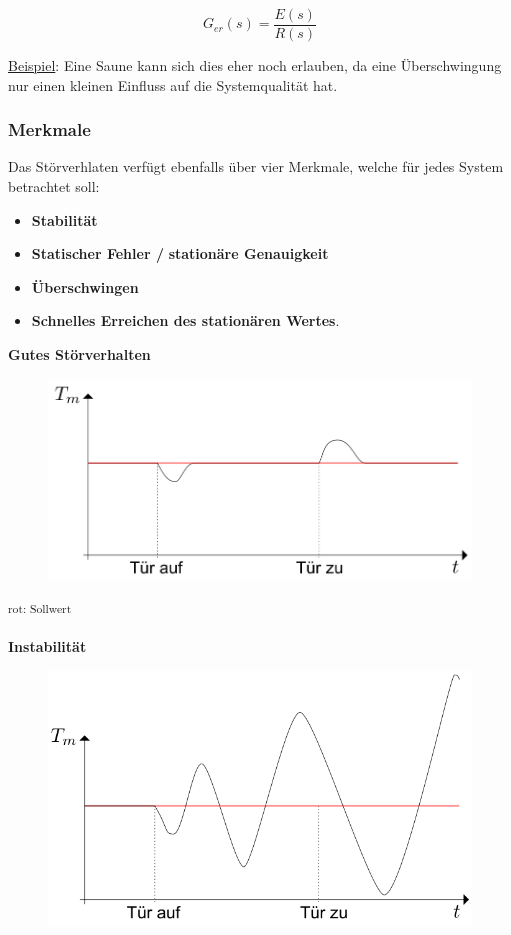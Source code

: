 \documentclass[
  10pt,
  a4paper,
]{article}
\providecommand{\tightlist}{%
  \setlength{\itemsep}{0pt}\setlength{\parskip}{0pt}}\usepackage{longtable,booktabs,array}
\numberwithin{equation}{section}
\begin{document}
\begin{multicols}{2}
\[
G_{er}(s)=\frac{E(s)}{R(s)}
\]

\ul{Beispiel}: Eine Saune kann sich dies eher noch erlauben, da eine
Überschwingung nur einen kleinen Einfluss auf die Systemqualität hat.

\hypertarget{merkmale-1}{%
\subsubsection{Merkmale}\label{merkmale-1}}

Das Störverhlaten verfügt ebenfalls über vier Merkmale, welche für jedes
System betrachtet soll:

\begin{itemize}
\tightlist
\item
  \textbf{Stabilität}
\item
  \textbf{Statischer Fehler /} \textbf{stationäre Genauigkeit}
\item
  \textbf{Überschwingen}
\item
  \textbf{Schnelles Erreichen des stationären Wertes}.
\end{itemize}

\textbf{Gutes Störverhalten}

\begin{figure}[H]

{\centering \includegraphics{images/storverhalten/gutes_verhalten.png}

}

\end{figure}

\textsuperscript{rot: Sollwert}

\textbf{Instabilität}

\begin{figure}[H]

{\centering \includegraphics{images/storverhalten/storverhalten_stability.png}

}
\end{figure}
\end{multicols}
\end{document}
